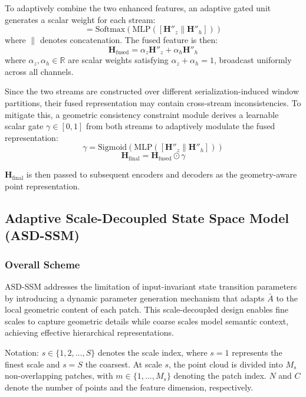 \documentclass[a4paper,fleqn]{cas-dc}
\begin{document}
To adaptively combine the two enhanced features, an adaptive gated unit generates a scalar weight for each stream:
\begin{equation}
[\alpha_z, \alpha_h] = \text{Softmax}(\text{MLP}([\mathbf{H}''_z \| \mathbf{H}''_h]))
\end{equation}
where $\|$ denotes concatenation. The fused feature is then:
\begin{equation}
\mathbf{H}_{\text{fused}} = \alpha_z \mathbf{H}''_z + \alpha_h \mathbf{H}''_h
\end{equation}
where $\alpha_z, \alpha_h \in \mathbb{R}$ are scalar weights satisfying $\alpha_z + \alpha_h = 1$, broadcast uniformly across all channels.

Since the two streams are constructed over different serialization-induced window partitions, their fused representation may contain cross-stream inconsistencies. To mitigate this, a geometric consistency constraint module derives a learnable scalar gate $\gamma \in [0,1]$ from both streams to adaptively modulate the fused representation:
\begin{equation}
\gamma = \text{Sigmoid}(\text{MLP}([\mathbf{H}''_z \| \mathbf{H}''_h]))
\end{equation}
\begin{equation}
\mathbf{H}_{\text{final}} = \mathbf{H}_{\text{fused}} \odot \gamma
\end{equation}

$\mathbf{H}_{\text{final}}$ is then passed to subsequent encoders and decoders as the geometry-aware point representation.


\subsection{Adaptive Scale-Decoupled State Space Model (ASD-SSM)}

\subsubsection{Overall Scheme}
ASD-SSM addresses the limitation of input-invariant state transition parameters  by introducing a dynamic parameter generation mechanism that adapts $\bar{A}$ to the local geometric content of each patch. This scale-decoupled design enables fine scales to capture geometric details while coarse scales model semantic context, achieving effective hierarchical representations.

Notation: $s \in \{1, 2, \ldots, S\}$ denotes the scale index, where $s=1$ represents the finest scale and $s=S$ the coarsest. At scale $s$, the point cloud is divided into $M_s$ non-overlapping patches, with $m \in \{1, \ldots, M_s\}$ denoting the patch index. $N$ and $C$ denote the number of points and the feature dimension, respectively.
\end{document}
